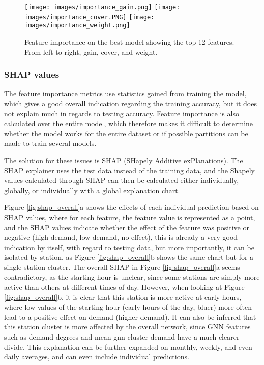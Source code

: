 \documentclass{article}
\begin{document}
\begin{figure}
    
    \texttt{[image: images/importance\_gain.png]}
    \texttt{[image: images/importance\_cover.PNG]}
    \texttt{[image: images/importance\_weight.png]}
    \caption{Feature importance on the best model showing the top 12 features. From left to right, gain, cover, and weight.}
\label{fig:importance_top_12}
\end{figure}


\subsubsection{SHAP values}

The feature importance metrics use statistics gained from training the model, which gives a good overall indication regarding the training accuracy, but it does not explain much in regards to testing accuracy. Feature importance is also calculated over the entire model, which therefore makes it difficult to determine whether the model works for the entire dataset or if possible partitions can be made to train several models.

The solution for these issues is SHAP (SHapely Additive exPlanations)\cite{Lundberg2017}. The SHAP explainer uses the test data instead of the training data, and the Shapely values calculated through SHAP can then be calculated either individually, globally, or individually with a global explanation chart. 

Figure \ref{fig:shap_overall}a shows the effects of each individual prediction based on SHAP values, where for each feature, the feature value is represented as a point, and the SHAP values indicate whether the effect of the feature was positive or negative (high demand, low demand, no effect), this is already a very good indication by itself, with regard to testing data, but more importantly, it can be isolated by station, as Figure \ref{fig:shap_overall}b shows the same chart but for a single station cluster. The overall SHAP in Figure \ref{fig:shap_overall}a seems contradictory, as the starting hour is unclear, since some stations are simply more active than others at different times of day. However, when looking at Figure \ref{fig:shap_overall}b, it is clear that this station is more active at early hours, where low values of the starting hour (early hours of the day, bluer) more often lead to a positive effect on demand (higher demand). It can also be inferred that this station cluster is more affected by the overall network, since GNN features such as demand degrees and mean gnn cluster demand have a much clearer divide. This explanation can be further expanded on monthly, weekly, and even daily averages, and can even include individual predictions.
\end{document}

